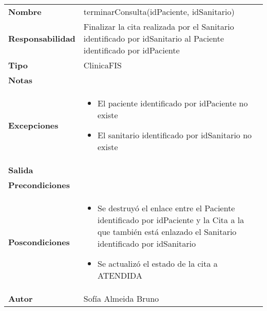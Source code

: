 \documentclass[11pt,a4paper]{article}
\newenvironment{itemizenomargins}
    {\begin{minipage}[t]{1\linewidth}\begin{itemize}}
    {\end{itemize}\end{minipage}}
\begin{document}
\begin{table}[H]
\centering
\label{my-label}
\begin{tabularx}{\textwidth}{l|X}
\textbf{Nombre}          & terminarConsulta(idPaciente, idSanitario) \\
\textbf{Responsabilidad} & Finalizar la cita realizada por el Sanitario identificado por idSanitario al Paciente identificado por idPaciente\\
\textbf{Tipo}            & ClinicaFIS \\
\textbf{Notas}           &  \\
\textbf{Excepciones}     & 
\begin{itemizenomargins}
\item El paciente identificado por idPaciente no existe
\item El sanitario identificado por idSanitario no existe
\end{itemizenomargins}\\
\textbf{Salida}          &  \\
\textbf{Precondiciones}  &  \\
\textbf{Poscondiciones}  & \begin{itemizenomargins}
\item Se destruyó el enlace entre el Paciente identificado por idPaciente y la Cita a la que también está enlazado el Sanitario identificado por idSanitario
\item Se actualizó el estado de la cita a ATENDIDA
\end{itemizenomargins}\\
\textbf{Autor}           & Sofía Almeida Bruno
\end{tabularx}
\end{table}
\end{document}
